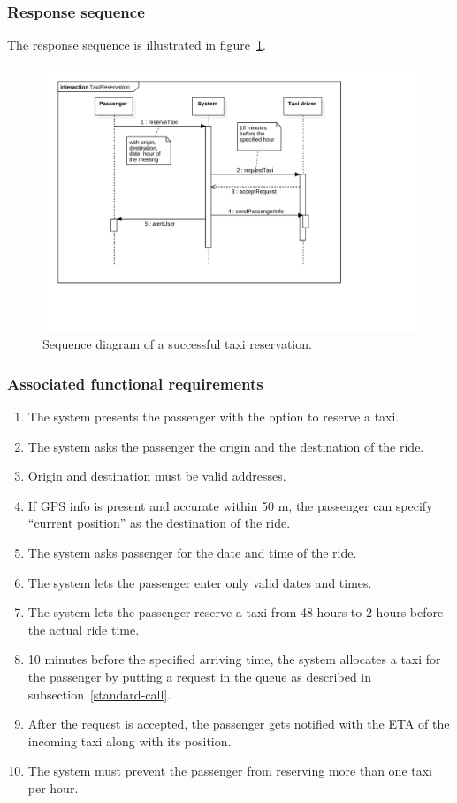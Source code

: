 \subsubsection{Response sequence}
The response sequence is illustrated in figure~\ref{fig:sequence-taxireservation}.
\begin{figure}
	\includegraphics[width=\textwidth]{diagrams/sequence_taxireservation.pdf}
	\caption{Sequence diagram of a successful taxi reservation.}
	\label{fig:sequence-taxireservation}
\end{figure}

\subsubsection{Associated functional requirements}
\begin{enumerate}
	\item The system presents the passenger with the option to reserve a taxi.
	\item The system asks the passenger the origin and the destination of the ride.
	\item Origin and destination must be valid addresses.
	\item If GPS info is present and accurate within 50 m, the passenger can specify ``current position'' as the destination of the ride.
	\item The system asks passenger for the date and time of the ride.
	\item The system lets the passenger enter only valid dates and times.
	\item The system lets the passenger reserve a taxi from 48 hours to 2 hours before the actual ride time.
	\item 10 minutes before the specified arriving time, the system allocates a taxi for the passenger by putting a request in the queue as described in subsection~\ref{standard-call}.
	\item After the request is accepted, the passenger gets notified with the ETA of the incoming taxi along with its position.
	\item The system must prevent the passenger from reserving more than one taxi per hour.
\end{enumerate}
